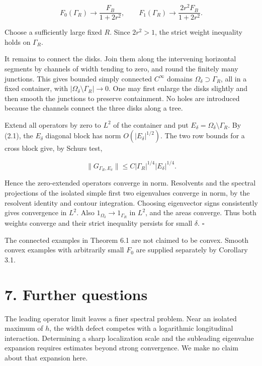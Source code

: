 \documentclass[11pt]{article}
\begin{document}
\[
F_0(\Gamma_R)\longrightarrow\frac{F_B}{1+2r^2},
\qquad
F_1(\Gamma_R)\longrightarrow\frac{2r^2F_B}{1+2r^2}.
\tag{6.5}
\]

Choose a sufficiently large fixed \(R\). Since \(2r^2>1\), the strict
weight inequality holds on \(\Gamma_R\).

It remains to connect the disks. Join them along the intervening
horizontal segments by channels of width tending to zero, and round the
finitely many junctions. This gives bounded simply connected
\(C^\infty\) domains \(\Omega_\delta\supset\Gamma_R\), all in a fixed
container, with \(|\Omega_\delta\setminus\Gamma_R|\to0\). One may first
enlarge the disks slightly and then smooth the junctions to preserve
containment. No holes are introduced because the channels connect the
three disks along a tree.

Extend all operators by zero to \(L^2\) of the container and put
\(E_\delta=\Omega_\delta\setminus\Gamma_R\). By (2.1), the \(E_\delta\)
diagonal block has norm \(O(|E_\delta|^{1/2})\). The two row bounds for
a cross block give, by Schur\textquotesingle s test,

\[
\|G_{\Gamma_R,E_\delta}\|
 \le C|\Gamma_R|^{1/4}|E_\delta|^{1/4}.
\tag{6.6}
\]

Hence the zero-extended operators converge in norm. Resolvents and the
spectral projections of the isolated simple first two eigenvalues
converge in norm, by the resolvent identity and contour integration.
Choosing eigenvector signs consistently gives convergence in \(L^2\).
Also \(1_{\Omega_\delta}\to1_{\Gamma_R}\) in \(L^2\), and the areas
converge. Thus both weights converge and their strict inequality
persists for small \(\delta\). \(\square\)

The connected examples in Theorem 6.1 are not claimed to be convex.
Smooth convex examples with arbitrarily small \(F_0\) are supplied
separately by Corollary 3.1.

\section{7. Further questions}\label{further-questions}

The leading operator limit leaves a finer spectral problem. Near an
isolated maximum of \(h\), the width defect competes with a logarithmic
longitudinal interaction. Determining a sharp localization scale and the
subleading eigenvalue expansion requires estimates beyond strong
convergence. We make no claim about that expansion here.
\end{document}
